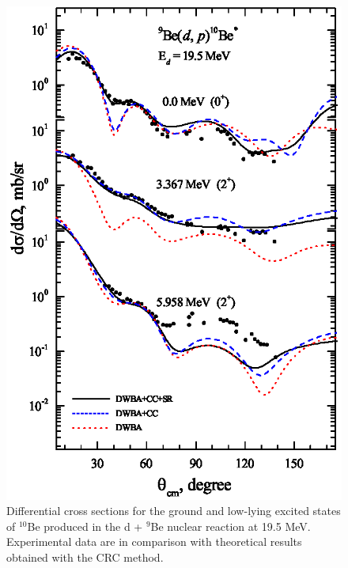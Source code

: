 \documentclass[10pt]{iopart}
\begin{document}
\begin{figure}[tp]
\includegraphics[scale=0.8]{1H10BE.eps}
\caption{\label{1H10BE} Differential cross sections for the ground and low-lying excited states of $^{10}$Be  produced in the d + $^9$Be nuclear reaction at 19.5 MeV. Experimental data are in comparison with  theoretical results obtained with the CRC method.  }
\end{figure}
\end{document}
